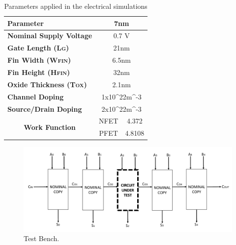 \documentclass[ecp,tc, english]{iiufrgs}
\begin{document}
\begin{table}[H]
\centering
\caption{Parameters applied in the electrical simulations}
\label{electPar}
\begin{tabular}{lcc}
\hline
\textbf{Parameter}                                            & \multicolumn{2}{c}{\textbf{7nm}}                                  \\ \hline
\textbf{Nominal Supply Voltage}                               & \multicolumn{2}{c}{0.7 V}                                         \\ \hline
\textbf{Gate Length (L\textsc{g})}           & \multicolumn{2}{c}{21nm}                                          \\ \hline
\textbf{Fin Width (W\textsc{fin})}              & \multicolumn{2}{c}{6.5nm}                                         \\ \hline
\textbf{Fin Height (H\textsc{fin})}          & \multicolumn{2}{c}{32nm}                                          \\ \hline
\textbf{Oxide Thickness (T\textsc{ox})}      & \multicolumn{2}{c}{2.1nm}                                         \\ \hline
\textbf{Channel Doping}                                       & \multicolumn{2}{c}{1x10^{22}m^{-3}}                                     \\ \hline
\textbf{Source/Drain Doping}                                  & \multicolumn{2}{c}{2x10^{22}m^{-3}} \\ \hline
\multicolumn{1}{c}{\multirow{2}{*}{\textbf{Work Function}}} & NFET                            & 4.372                            \\ \cline{2-3} 
\multicolumn{1}{c}{}                                        & PFET                            & 4.8108                           \\ \hline
\end{tabular}
\end{table}

\begin{figure}[H]
\centering
\includegraphics[width=\textwidth]{testbench.pdf}
\caption{Test Bench.}
\label{fig:Fig6}
\end{figure}
\end{document}
